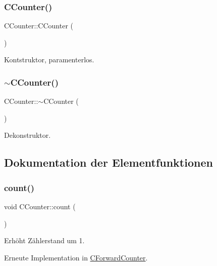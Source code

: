 \subsubsection{\texorpdfstring{C\+Counter()}{CCounter()}}
{\footnotesize\ttfamily C\+Counter\+::\+C\+Counter (\begin{DoxyParamCaption}{ }\end{DoxyParamCaption})}



Kontstruktor, paramenterlos. 

\mbox{\label{class_c_counter_a1af3cc000781fcd67b9e4fe1b25fbc9c}} 
\subsubsection{\texorpdfstring{$\sim$\+C\+Counter()}{~CCounter()}}
{\footnotesize\ttfamily C\+Counter\+::$\sim$\+C\+Counter (\begin{DoxyParamCaption}{ }\end{DoxyParamCaption})\hspace{0.3cm}{\ttfamily [virtual]}}



Dekonstruktor. 



\subsection{Dokumentation der Elementfunktionen}
\mbox{\label{class_c_counter_a90f3e164f3fc1dcf91044702d6940c4d}} 
\subsubsection{\texorpdfstring{count()}{count()}}
{\footnotesize\ttfamily void C\+Counter\+::count (\begin{DoxyParamCaption}{ }\end{DoxyParamCaption})\hspace{0.3cm}{\ttfamily [virtual]}}



Erhöht Zählerstand um 1. 



Erneute Implementation in \hyperlink{class_c_forward_counter_afc451afa9f8b76f70b28c08982265a86}{C\+Forward\+Counter}.

